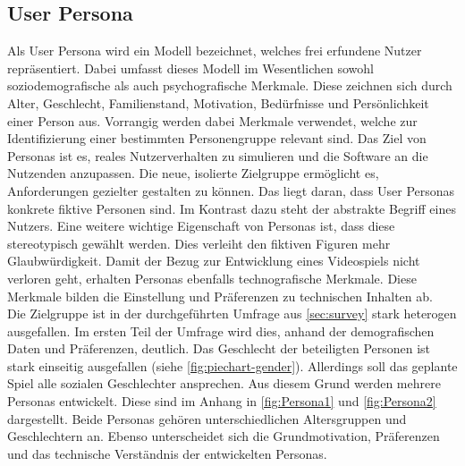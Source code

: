 \subsection{User Persona}\label{sec:persona}
Als User Persona wird ein Modell bezeichnet, welches frei erfundene Nutzer repräsentiert\cite[S.123 f]{cooper-alan}. Dabei umfasst dieses Modell im Wesentlichen sowohl soziodemografische als auch psychografische Merkmale. Diese zeichnen sich durch Alter, Geschlecht, Familienstand, Motivation, Bedürfnisse und Persönlichkeit einer Person aus. Vorrangig werden dabei Merkmale verwendet, welche zur Identifizierung einer bestimmten Personengruppe relevant sind.
Das Ziel von Personas ist es, reales Nutzerverhalten zu simulieren und die Software an die Nutzenden anzupassen. Die neue, isolierte Zielgruppe ermöglicht es, Anforderungen gezielter gestalten zu können. Das liegt daran, dass User Personas konkrete fiktive Personen sind. Im Kontrast dazu steht der abstrakte Begriff eines Nutzers. Eine weitere wichtige Eigenschaft von Personas ist, dass diese stereotypisch gewählt werden. Dies verleiht den fiktiven Figuren mehr Glaubwürdigkeit\cite[S.127 f]{cooper-alan}. Damit der Bezug zur Entwicklung eines Videospiels nicht verloren geht, erhalten Personas ebenfalls technografische Merkmale\cite{tagungsband}. Diese Merkmale bilden die Einstellung und Präferenzen zu technischen Inhalten ab. \\

Die Zielgruppe ist in der durchgeführten Umfrage aus \autoref{sec:survey} stark heterogen ausgefallen. Im ersten Teil der Umfrage wird dies, anhand der demografischen Daten und Präferenzen, deutlich. Das Geschlecht der beteiligten Personen ist stark einseitig ausgefallen (siehe \autoref{fig:piechart-gender}). Allerdings soll das geplante Spiel alle sozialen Geschlechter ansprechen. Aus diesem Grund werden mehrere Personas entwickelt. Diese sind im Anhang in \autoref{fig:Persona1} und \autoref{fig:Persona2} dargestellt. Beide Personas gehören unterschiedlichen Altersgruppen und Geschlechtern an. Ebenso unterscheidet sich die Grundmotivation, Präferenzen und das technische Verständnis der entwickelten Personas. \\

